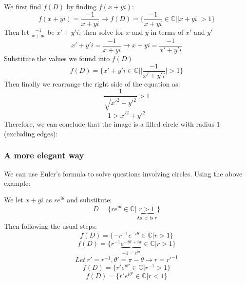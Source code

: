 \documentclass{article}
\begin{document}
\begin{center}
We first find $f(D)$ by finding $f(x+yi)$:
\[f(x+yi)=\frac{-1}{x+yi}\rightarrow f(D)=\{\frac{-1}{x+yi}\in \mathds{C}||x+yi|>1\}\]
Then let $\frac{-1}{x+yi}$ be $x'+y'i$, then solve for $x$ and $y$ in terms of $x'$ and $y'$
\[x'+y'i=\frac{-1}{x+yi}\rightarrow x+yi=\frac{-1}{x'+y'i}\]
Substitute the values we found into $f(D)$
\[f(D)=\{x'+y'i\in \mathds{C}||\frac{-1}{x'+y'i}|>1\}\]
Then finally we rearrange the right side of the equation as:
\[\frac{1}{\sqrt{x'^2+y'^2}}>1\]
\[1>x'^2+y'^2\]
Therefore, we can conclude that the image is a filled circle with radius 1 (excluding edges):

\end{center}

\subsubsection{A more elegant way}
We can use Euler's formula to solve questions involving circles. Using the above example:
\begin{center}
    We let $x+yi$ as $re^{i\theta}$ and substitute:
    \[D=\{re^{i\theta}\in\mathds{C}|\underbrace{r>1}_{\text{As $|z|$ is $r$}}\}\]
    Then following the usual steps:
    \[f(D)=\{-r^{-1}e^{-i\theta}\in \mathds{C}| r > 1\}\]
    \[f(D)=\{r^{-1}\underbrace{e^{-i\theta+i\pi}}_{-1=e^{i\pi}}\in \mathds{C}| r > 1\}\]
    \[Let\ r'=r^{-1}, \theta'=\pi-\theta\rightarrow r=r'^{-1}\]
    \[f(D)=\{r'e^{i\theta'}\in \mathds{C}| r^{-1} > 1\}\]
    \[f(D)=\{r'e^{i\theta'}\in \mathds{C}| r < 1\}\]
\end{center}
\end{document}
